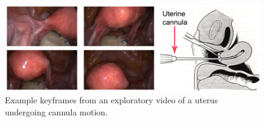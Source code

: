 

\begin{figure}[t]
  \centering
  \includegraphics[width=0.79\columnwidth]{./figs/exploratory.pdf}
  \caption{Example keyframes from an exploratory video of a uterus undergoing cannula motion.}
	\label{fig:cannula}
\end{figure}



